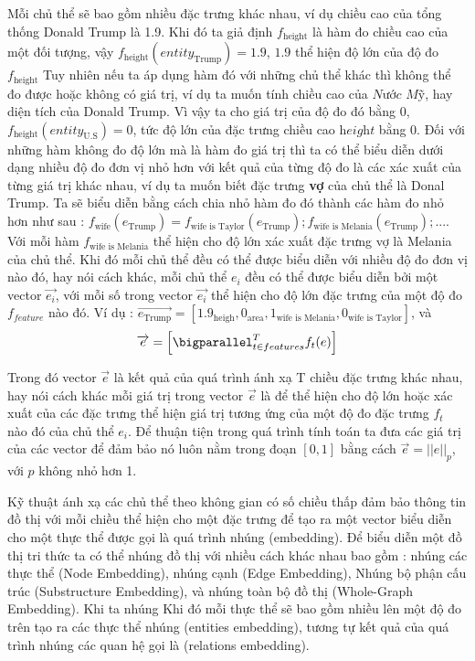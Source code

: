 Mỗi chủ thể sẽ bao gồm nhiều đặc trưng khác nhau, ví dụ chiều cao của tổng thống Donald Trump là 1.9. Khi đó ta giả định $f_\text{height}$ là hàm đo chiều cao của một đối tượng, vậy $f_\text{height}(entity_\text{Trump}) = 1.9$, $1.9$ thể hiện độ lớn của độ đo $f_\text{height}$ Tuy nhiên nếu ta áp dụng hàm đó với những chủ thể khác thì không thể đo được hoặc không có giá trị, ví dụ ta muốn tính chiều cao của $\textit{Nước Mỹ}$, hay diện tích của Donald Trump. Vì vậy ta cho giá trị của độ đo đó bằng $0$, $f_\text{height}(entity_\text{U.S}) = 0$, tức độ lớn của đặc trưng chiều cao $\textit{height}$ bằng 0. Đối với những hàm không đo độ lớn mà là hàm đo giá trị thì ta có thể biểu diễn dưới dạng nhiều độ đo đơn vị nhỏ hơn với kết quả của từng độ đo là các xác xuất của từng giá trị khác nhau, ví dụ ta muốn biết đặc trưng \textbf{vợ} của chủ thể là Donal Trump. Ta sẽ biểu diễn bằng cách chia nhỏ hàm đo đó thành các hàm đo nhỏ hơn như sau : \(f_\text{wife}(e_\text{Trump}) = f_\text{wife is Taylor}(e_\text{Trump}); f_\text{wife is Melania}(e_\text{Trump});... \). Với mỗi hàm $f_\text{wife is Melania}$ thể hiện cho độ lớn xác xuất đặc trưng vợ là Melania của chủ thể. Khi đó mỗi chủ thể đều có thể được biểu diễn với nhiều độ đo đơn vị nào đó, hay nói cách khác, mỗi chủ thể $e_i$ đều có thể được biểu diễn bởi một vector $\overrightarrow{e_i}$, với mỗi số trong vector $\overrightarrow{e_i}$ thể hiện cho độ lớn đặc trưng của một độ đo $f_{feature}$ nào đó.  Ví dụ : $\overrightarrow{e_\text{Trump}} = [1.9_{\text{heigh}}, 0_{\text{area}}, 1_\text{wife is Melania}, 0_\text{wife is Taylor}]$, và 
$$
\overrightarrow{e}=\Big[ \bigparallel_{t \in features}^{T} f_{t}{}(e) \Big]
$$

Trong đó vector $\overrightarrow{e}$ là kết quả của quá trình ánh xạ T chiều đặc trưng khác nhau, hay nói cách khác mỗi giá trị trong vector \(\overrightarrow{e}\) là để thể hiện cho độ lớn hoặc xác xuất của các đặc trưng thể hiện giá trị tương ứng của một độ đo đặc trưng $f_t$ nào đó của chủ thể $e_i$. Để thuận tiện trong quá trình tính toán ta đưa các giá trị của các vector để đảm bảo nó luôn nằm trong đoạn $[0, 1]$ bằng cách  $\overrightarrow{e} = || e ||_p$, với $p$ không nhỏ hơn 1.

Kỹ thuật ánh xạ các chủ thể theo không gian có số chiều thấp đảm bảo thông tin đồ thị với mỗi chiều thể hiện cho một đặc trưng để tạo ra một vector biểu diễn cho một thực thể được gọi là quá trình nhúng (embedding). Để biểu diễn một đồ thị tri thức ta có thể nhúng đồ thị với nhiều cách khác nhau bao gồm : nhúng các thực thể (Node Embedding), nhúng cạnh (Edge Embedding), Nhúng bộ phận cấu trúc (Substructure Embedding), và nhúng toàn bộ đồ thị (Whole-Graph Embedding). Khi ta nhúng Khi đó mỗi thực thể sẽ bao gồm nhiều  lên một độ đo trên tạo ra các thực thể nhúng (entities embedding), tương tự kết quả của quá trình nhúng các quan hệ gọi là (relations embedding).

